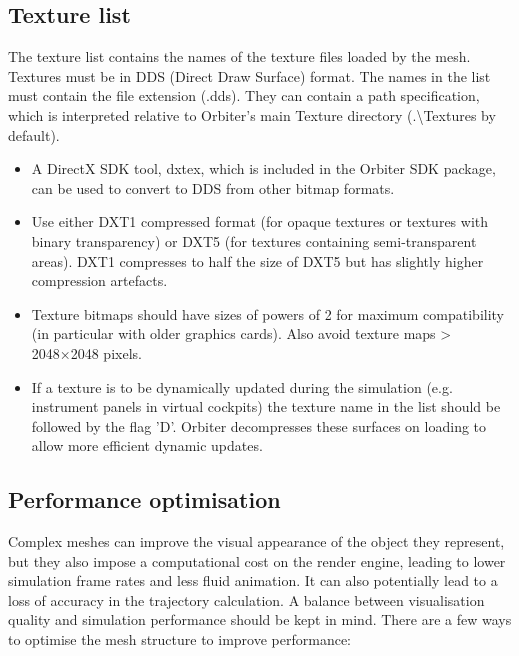 \documentclass[Orbiter Developer Manual.tex]{subfiles}
\begin{document}
\subsection{Texture list}
The texture list contains the names of the texture files loaded by the mesh. Textures must be in DDS (Direct Draw Surface) format. The names in the list must contain the file extension (.dds). They can contain a path specification, which is interpreted relative to Orbiter's main Texture directory (.\textbackslash Textures by default).

\begin{itemize}
\item A DirectX SDK tool, dxtex, which is included in the Orbiter SDK package, can be used to convert to DDS from other bitmap formats.
\item Use either DXT1 compressed format (for opaque textures or textures with binary transparency) or DXT5 (for textures containing semi-transparent areas). DXT1 compresses to half the size of DXT5 but has slightly higher compression artefacts.
\item Texture bitmaps should have sizes of powers of 2 for maximum compatibility (in particular with older graphics cards). Also avoid texture maps > 2048×2048 pixels.
\item If a texture is to be dynamically updated during the simulation (e.g. instrument panels in virtual cockpits) the texture name in the list should be followed by the flag 'D'. Orbiter decompresses these surfaces on loading to allow more efficient dynamic updates.
\end{itemize}


\subsection{Performance optimisation}
Complex meshes can improve the visual appearance of the object they represent, but they also impose a computational cost on the render engine, leading to lower simulation frame rates and less fluid animation. It can also potentially lead to a loss of accuracy in the trajectory calculation. A balance between visualisation quality and simulation performance should be kept in mind. There are a few ways to optimise the mesh structure to improve performance:
\end{document}
